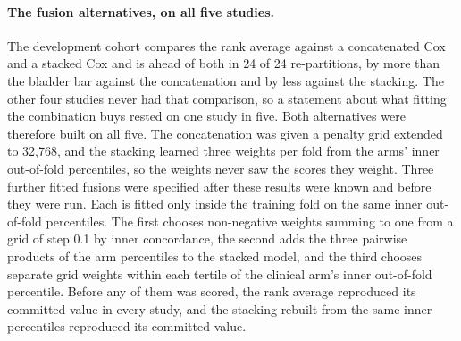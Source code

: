 \documentclass[11pt]{article}
\begin{document}
\paragraph{The fusion alternatives, on all five studies.} The development cohort compares the rank
average against a concatenated Cox and a stacked Cox and is ahead of both in 24 of 24 re-partitions,
by more than the bladder bar against the concatenation and by less against the stacking. The
other four studies never had that comparison, so a statement about what fitting the combination buys
rested on one study in five. Both alternatives were therefore built on all five. The concatenation
was given a penalty grid extended to 32,768, and the stacking learned three weights per fold from the
arms' inner out-of-fold percentiles, so the weights never saw the scores they weight. Three further
fitted fusions were specified after these results were known and before they were run. Each is fitted
only inside the training fold on the same inner out-of-fold percentiles. The first chooses
non-negative weights summing to one from a grid of step 0.1 by inner concordance, the second adds the
three pairwise products of the arm percentiles to the stacked model, and the third chooses separate
grid weights within each tertile of the clinical arm's inner out-of-fold percentile. Before any of them was scored, the rank average reproduced its
committed value in every study, and the stacking rebuilt from the same inner percentiles reproduced
its committed value.
\end{document}
